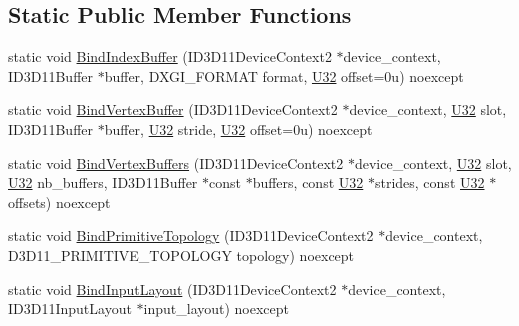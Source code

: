 \subsection*{Static Public Member Functions}
\begin{DoxyCompactItemize}
\item 
static void \hyperlink{structmage_1_1_pipeline_1_1_i_a_a84b1831a4a0392abc0e1146d69f1e686}{Bind\+Index\+Buffer} (I\+D3\+D11\+Device\+Context2 $\ast$device\+\_\+context, I\+D3\+D11\+Buffer $\ast$buffer, D\+X\+G\+I\+\_\+\+F\+O\+R\+M\+AT format, \hyperlink{namespacemage_a41c104c036fba3756a74e19f793eeaa1}{U32} offset=0u) noexcept
\item 
static void \hyperlink{structmage_1_1_pipeline_1_1_i_a_a3e4ec0ba4b2ce6ee7bc4c0e3f15349c4}{Bind\+Vertex\+Buffer} (I\+D3\+D11\+Device\+Context2 $\ast$device\+\_\+context, \hyperlink{namespacemage_a41c104c036fba3756a74e19f793eeaa1}{U32} slot, I\+D3\+D11\+Buffer $\ast$buffer, \hyperlink{namespacemage_a41c104c036fba3756a74e19f793eeaa1}{U32} stride, \hyperlink{namespacemage_a41c104c036fba3756a74e19f793eeaa1}{U32} offset=0u) noexcept
\item 
static void \hyperlink{structmage_1_1_pipeline_1_1_i_a_a8a58d42cf1acfa0f37b0b02e26c78bed}{Bind\+Vertex\+Buffers} (I\+D3\+D11\+Device\+Context2 $\ast$device\+\_\+context, \hyperlink{namespacemage_a41c104c036fba3756a74e19f793eeaa1}{U32} slot, \hyperlink{namespacemage_a41c104c036fba3756a74e19f793eeaa1}{U32} nb\+\_\+buffers, I\+D3\+D11\+Buffer $\ast$const $\ast$buffers, const \hyperlink{namespacemage_a41c104c036fba3756a74e19f793eeaa1}{U32} $\ast$strides, const \hyperlink{namespacemage_a41c104c036fba3756a74e19f793eeaa1}{U32} $\ast$offsets) noexcept
\item 
static void \hyperlink{structmage_1_1_pipeline_1_1_i_a_a85a1ef979962c1dabfd888367a65195c}{Bind\+Primitive\+Topology} (I\+D3\+D11\+Device\+Context2 $\ast$device\+\_\+context, D3\+D11\+\_\+\+P\+R\+I\+M\+I\+T\+I\+V\+E\+\_\+\+T\+O\+P\+O\+L\+O\+GY topology) noexcept
\item 
static void \hyperlink{structmage_1_1_pipeline_1_1_i_a_a5bf76608b2b5b4f51fc20c99ca47694e}{Bind\+Input\+Layout} (I\+D3\+D11\+Device\+Context2 $\ast$device\+\_\+context, I\+D3\+D11\+Input\+Layout $\ast$input\+\_\+layout) noexcept
\end{DoxyCompactItemize}
